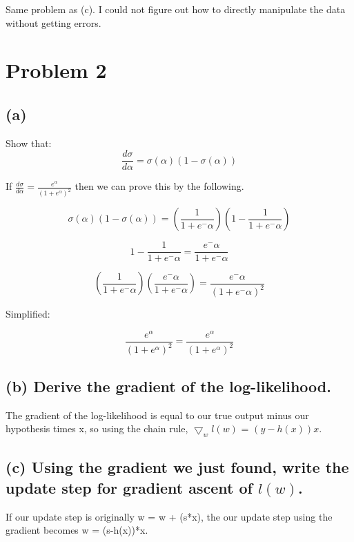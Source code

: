 \documentclass[11pt]{article}
\begin{document}
Same problem as (c). I could not figure out how to directly manipulate the data without getting errors.

\section*{Problem 2}

\subsection*{(a)}

Show that:
\begin{equation*}
\frac{d\sigma}{d\alpha} = \sigma(\alpha)(1 - \sigma(\alpha))
\end{equation*}

If $\frac{d\sigma}{d\alpha} = \frac{e^\alpha}{(1 + e^\alpha)^2}$ then we can prove this by the following.

\begin{equation*}
\sigma(\alpha)(1 - \sigma(\alpha)) = (\frac{1}{1 + e^-\alpha})(1 -\frac{1}{1 + e^-\alpha})
\end{equation*}

\begin{equation*}
1 -\frac{1}{1 + e^-\alpha} = \frac{e^-\alpha}{1 + e^-\alpha}
\end{equation*}

\begin{equation*}
(\frac{1}{1 + e^-\alpha})(\frac{e^-\alpha}{1 + e^-\alpha}) = \frac{e^-\alpha}{(1 + e^-\alpha)^2}
\end{equation*}

Simplified:

\begin{equation*}
\frac{e^\alpha}{(1 + e^\alpha)^2} = \frac{e^\alpha}{(1 + e^\alpha)^2}
\end{equation*}

\subsection*{(b) Derive the gradient of the log-likelihood.}

The gradient of the log-likelihood is equal to our true output minus our hypothesis times x, so using the chain rule, $\bigtriangledown_wl(w)$ = $(y - h(x))x$.

\subsection*{(c) Using the gradient we just found, write the update step for gradient ascent of $l(w)$.}

If our update step is originally w = w + (s*x), the our update step using the gradient becomes w = (s-h(x))*x.
\end{document}
